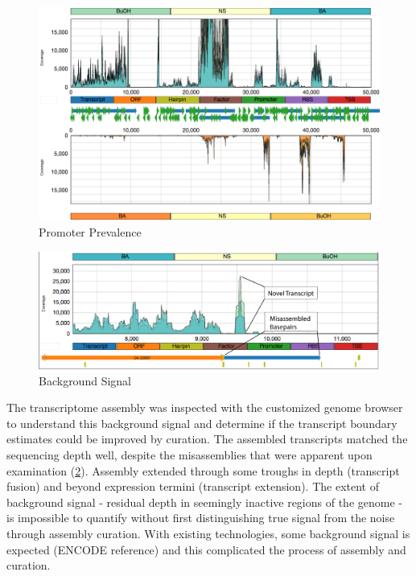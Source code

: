 \begin{figure}
\includegraphics[width=\textwidth]{images/Assembly/Background_signal/promoter_prevalence.png}
\caption{Promoter Prevalence}\label{fig:5.7}
\end{figure}



\begin{figure}
\includegraphics[width=\textwidth]{images/Assembly/Background_signal/Background_signal.png}
\caption{Background Signal}\label{fig:5.8}
\end{figure}


The transcriptome assembly was inspected with the customized genome browser to understand this background signal and determine if the transcript boundary estimates could be improved by curation. The assembled transcripts matched the sequencing depth well, despite the misassemblies that were apparent upon examination (\ref{fig:5.8}). Assembly extended through some troughs in depth (transcript fusion) and beyond expression termini (transcript extension). The extent of background signal - residual depth in seemingly inactive regions of the genome - is impossible to quantify without first distinguishing true signal from the noise through assembly curation. With existing technologies, some background signal is expected (ENCODE reference) and this complicated the process of assembly and curation.


